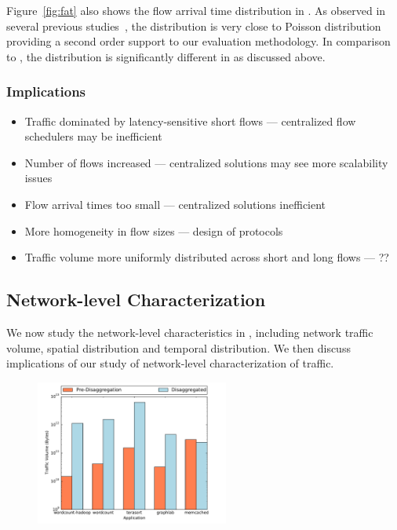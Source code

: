 Figure~\ref{fig:fat} also shows the flow arrival time distribution in \pdis. As observed in several previous studies~\cite{imc-srikanth, imc-theo}, the distribution is very close to Poisson distribution providing a second order support to our evaluation methodology. In comparison to \pdis, the distribution is significantly different in \dis as discussed above.

\subsubsection{Implications}
\begin{itemize}[leftmargin=*]
	\itemsep0em
	\item Traffic dominated by latency-sensitive short flows --- centralized flow schedulers may be inefficient
	\item Number of flows increased --- centralized solutions may see more scalability issues
	\item {} Flow arrival times too small --- centralized solutions inefficient
	\item More homogeneity in flow sizes --- design of protocols
	\item {} Traffic volume more uniformly distributed across short and long flows --- ??
\end{itemize}

\subsection{Network-level Characterization} 
\label{ssec:nlc}
We now study the network-level characteristics in \dis, including network traffic volume, spatial distribution and temporal distribution. We then discuss implications of our study of network-level characterization of \dis traffic.

%
\begin{figure}
  \centering
    \includegraphics[width = 2.5in]{img/graph5_trafficvolume} 
  \caption{\small{}}
  \label{fig:vol}
\end{figure}
%
